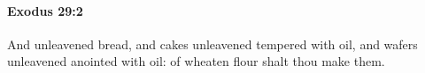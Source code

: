 
		\paragraph{Exodus 29:2} %
			\label{EXODUS-29-2}

			And unleavened bread, and cakes unleavened tempered with oil, and wafers unleavened anointed with oil: of wheaten flour shalt thou make them.



